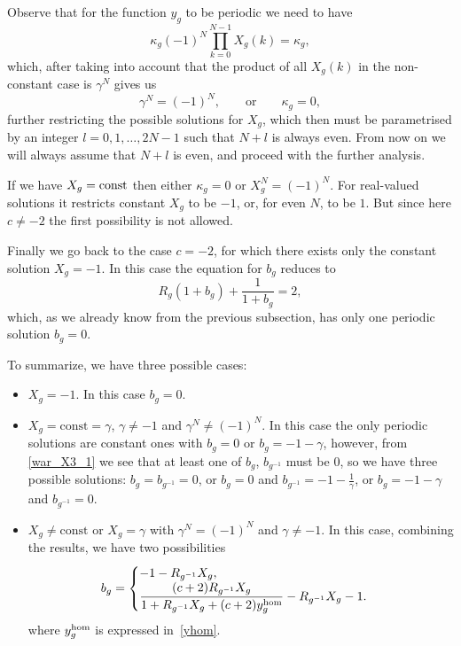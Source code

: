 \documentclass[10pt,a4paper]{amsart}
\numberwithin{equation}{section}
\begin{document}
Observe that for the function $y_g$ to be periodic we need to have
\[\kappa_g (-1)^N \prod_{k=0}^{N-1} X_g(k) = \kappa_g, \]
which, after taking into account that the product of all $X_g(k)$ in the non-constant case is $\gamma^N$ gives
us
\[ \gamma^N = (-1)^N, \qquad \text{or} \qquad \kappa_g=0,\]
further restricting the possible solutions for $X_g$, which then must be parametrised by an integer $l =0,1,\ldots, 2N-1$ such that $N+l$ is always even.
From now on we will always assume that $N+l$ is even, and proceed with the further analysis.

If we have $X_g=\hbox{const}$ then either $\kappa_g=0$ or $X_g^N=(-1)^N$. For real-valued solutions it restricts constant $X_g$ to be $-1$, or, for even $N$, to be $1$. But since here $c \neq -2$ the first possibility is not allowed.

Finally we go back to the case $c=-2$, for which there exists only the constant solution $X_g=-1$. In this case the equation for $b_g$
reduces to
\[
R_g(1+b_g)+\frac{1}{1+b_g}=2,
\]
which, as we already know from the previous subsection, has only one periodic solution $b_g=0$.

To summarize, we have three possible cases:
\begin{itemize}\itemsep=0pt
\item ${X_g = -1}$. In this case $b_g=0$.

\item ${X_g = \text{const}=\gamma}$, ${\gamma \not=-1}$ and ${\gamma^N\neq (-1)^N}$.
In this case the only periodic solutions are constant ones with $b_g=0$ or $b_g=-1-\gamma$, however,
from \eqref{war_X3_1} we see that at least one of $b_g$, $b_{g^{-1}}$ must be $0$, so we have
three possible solutions: $b_g=b_{g^{-1}}=0$, or
$b_g=0$ and $b_{g^{-1}}=-1-\frac{1}{\gamma}$, or $b_g=-1-\gamma$ and $b_{g^{-1}}=0$.

\item ${X_g \not= \text{const}}$ or ${X_g=\gamma}$ with ${\gamma^N=(-1)^N}$ and ${\gamma\neq -1}$.
In this case, combining the results, we have two possibilities
\begin{equation*}
b_g =
\begin{cases}
-1-R_{g^{-1}} X_g, \\
\dfrac{(c+2) R_{g^{-1}}X_g}{1+R_{g^{-1}} X_g+ (c+2) y^{{\rm hom}}_g}-R_{g^{-1}}X_g-1.
\end{cases}
\end{equation*}
where $y^{{\rm hom}}_g$ is expressed in~\eqref{yhom}.
\end{itemize}
\end{document}
